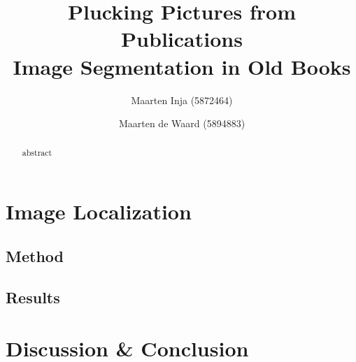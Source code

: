 \documentclass[draft]{article} %
\title{Plucking Pictures from Publications\\ \large
Image Segmentation in Old Books}
\author{Maarten Inja (5872464) \and Maarten de Waard (5894883)}
\begin{document}
\maketitle

\begin{abstract}
abstract
\end{abstract}














\section{Image Localization}
\label{sec:imageloc}

\subsection{Method}
\label{subsec:imagelocmethod}

\subsection{Results}
\label{subsec:imagelocresults}


\section{Discussion \& Conclusion}
\label{sec:discussionconclusion}




\end{document}
